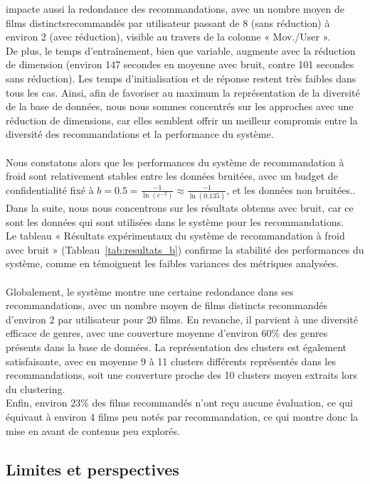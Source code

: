 \documentclass{article}
\begin{document}
impacte aussi la redondance des recommandations, avec un nombre moyen de films distinctsrecommandés par utilisateur passant de 8 (sans réduction) à environ 2 (avec réduction), visible au travers de la colonne « Mov./User ».\\
De plus, le temps d’entraînement, bien que variable, augmente avec la réduction de dimension (environ 147 secondes en moyenne avec bruit, contre 101 secondes sans réduction). Les temps d’initialisation et de réponse restent très faibles dans tous les cas.
Ainsi, afin de favoriser au maximum la représentation de la diversité de la base de données, nous nous sommes concentrés sur les approches avec une réduction de dimensions, car elles semblent offrir un meilleur compromis entre la diversité des recommandations et la performance du système.\\
\\
Nous constatons alors que les performances du système de recommandation à froid sont relativement stables entre les données bruitées, avec un budget de confidentialité fixé à $b = 0.5 = \frac{-1}{\ln(e^{-2})}\approx \frac{-1}{\ln(0.135)}$, et les données non bruitées.. Dans
la suite, nous nous concentrons sur les résultats obtenus avec bruit, car ce sont les données qui sont utilisées dans le système pour les recommandations.\\
Le tableau « Résultats expérimentaux du système de recommandation à froid avec bruit » (Tableau~\ref{tab:resultats_b}) confirme la stabilité des performances
du système, comme en témoignent les faibles variances des métriques analysées.\\
\\
Globalement, le système montre une certaine redondance dans ses recommandations, avec un nombre moyen de films distincts recommandés d’environ 2 par utilisateur pour 20 films. En revanche, il parvient à une
diversité efficace de genres, avec une couverture moyenne d’environ 60\% des genres présents dans la base de données.
La représentation des clusters est également satisfaisante, avec en moyenne 9 à 11 clusters différents représentés dans
les recommandations, soit une couverture proche des 10 clusters moyen extraits lors du clustering.\\
Enfin, environ 23\% des films recommandés n’ont reçu aucune évaluation, ce qui équivaut à environ 4 films peu notés par recommandation, ce qui montre donc la mise en avant de contenus peu explorés.\\

\subsection{Limites et perspectives}
\end{document}
